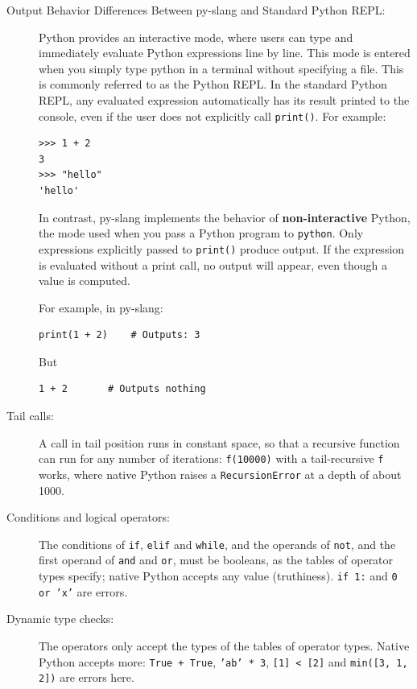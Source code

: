 \begin{description}  
\item[{Output Behavior Differences Between py-slang and Standard Python REPL:}]
  Python provides an interactive mode, where users can type and immediately 
  evaluate Python expressions line by line. This mode is entered when you 
  simply type python in a terminal without specifying a file. This is commonly 
  referred to as the Python REPL. 
  In the standard Python REPL, any evaluated expression automatically has its 
  result printed to the console, even if the user does not explicitly call 
  \texttt{print()}. For example:

  \begin{lstlisting}
>>> 1 + 2
3
>>> "hello"
'hello'
  \end{lstlisting}

  In contrast, py-slang implements the behavior of \textbf{non-interactive}
  Python, the mode used when you pass a Python program to \texttt{python}.
  Only expressions explicitly passed to \texttt{print()} produce output. If the 
  expression is evaluated without a print call, no output will appear, even 
  though a value is computed.

  For example, in py-slang:

  \begin{lstlisting}
print(1 + 2)  	# Outputs: 3
  \end{lstlisting}

  But

  \begin{lstlisting}
1 + 2    	# Outputs nothing
  \end{lstlisting}

\item[{Tail calls:}]
  A call in tail position runs in constant space, so that a recursive function can
  run for any number of iterations: \texttt{f(10000)} with a tail-recursive
  \texttt{f} works, where native Python raises a \texttt{RecursionError} at a depth
  of about 1000.

\item[{Conditions and logical operators:}]
  The conditions of \texttt{if}, \texttt{elif} and \texttt{while}, and the operands
  of \texttt{not}, and the first operand of \texttt{and} and \texttt{or}, must be
  booleans, as the tables of operator types specify; native Python accepts any value
  (truthiness). \texttt{if 1:} and \texttt{0 or 'x'} are errors.

\item[{Dynamic type checks:}]
  The operators only accept the types of the tables of operator types. Native
  Python accepts more: \texttt{True + True}, \texttt{'ab' * 3}, \texttt{[1] < [2]}
  and \texttt{min([3, 1, 2])} are errors here.


\end{description}
